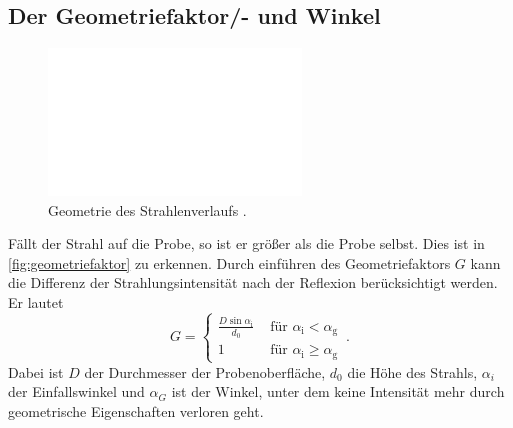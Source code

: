 \subsection{Der Geometriefaktor/- und Winkel}
\begin{figure}
    \centering
    \includegraphics[width=0.6\textwidth]{pictures/geometriefaktor.pdf}
    \caption{Geometrie des Strahlenverlaufs \cite{v44}.}
    \label{fig:geometriefaktor}
\end{figure}
Fällt der Strahl auf die Probe, so ist er größer als die Probe selbst.
Dies ist in \autoref{fig:geometriefaktor} zu erkennen.
Durch einführen des Geometriefaktors $G$ kann die Differenz der Strahlungsintensität nach der Reflexion berücksichtigt werden. 
Er lautet
\begin{equation}
    G= \begin{cases}\frac{D \sin \alpha_{\mathrm{i}}}{d_0} & \text { für } \alpha_{\mathrm{i}}<\alpha_{\mathrm{g}} \\ 1 & \text { für } \alpha_{\mathrm{i}} \geq \alpha_{\mathrm{g}}\end{cases} \, .
\end{equation}
Dabei ist $D$ der Durchmesser der Probenoberfläche, $d_0$ die Höhe des Strahls, $\alpha_i$ der Einfallswinkel und $\alpha_G$ ist der Winkel, unter dem keine Intensität mehr
durch geometrische Eigenschaften verloren geht.